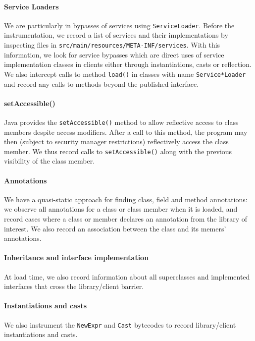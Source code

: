 \paragraph{Service Loaders} We are particularly in bypasses of 
services using \texttt{ServiceLoader}. Before the instrumentation, we record a list 
of services and their implementations by inspecting files in \texttt{src/main/resources/META-INF/services}.
With this information, we look for service bypasses which are direct uses of service implementation 
classes in clients either through instantiations, casts or reflection. We also intercept calls 
to method \texttt{load()} in classes with name \texttt{Service*Loader} and record any calls to methods beyond 
the published interface.

\paragraph{setAccessible()} 
Java provides the \texttt{setAccessible()} method to allow reflective access to class members despite
access modifiers. After a call to this method, the program may then (subject to security manager restrictions)
reflectively access the class member.
We thus record calls to \texttt{setAccessible()} along with the previous visibility of the class member.

\paragraph{Annotations} 
We have a quasi-static approach for finding class, field and method
annotations: we observe all annotations for a class or class member
when it is loaded, and record cases where a class or member declares an
annotation from the library of interest. We also record an association
between the class and its memers' annotations.

\paragraph{Inheritance and interface implementation} At load time,
we also record information about all superclasses and implemented interfaces
that cross the library/client barrier.

\paragraph{Instantiations and casts} We also instrument the
\texttt{NewExpr} and \texttt{Cast} bytecodes to record library/client 
instantiations and casts.



